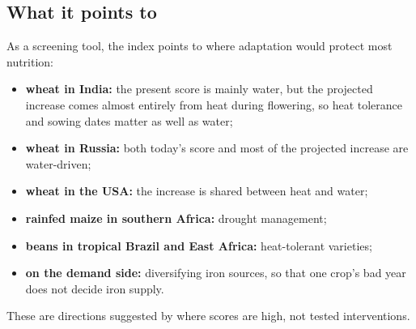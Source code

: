 \subsection{What it points to}
As a screening tool, the index points to where adaptation would protect most nutrition:
\begin{itemize}
\item \textbf{wheat in India:} the present score is mainly water, but the projected increase comes almost entirely
from heat during flowering, so heat tolerance and sowing dates matter as well as water;
\item \textbf{wheat in Russia:} both today's score and most of the projected increase are water-driven;
\item \textbf{wheat in the USA:} the increase is shared between heat and water;
\item \textbf{rainfed maize in southern Africa:} drought management;
\item \textbf{beans in tropical Brazil and East Africa:} heat-tolerant varieties;
\item \textbf{on the demand side:} diversifying iron sources, so that one crop's bad year does not decide iron
supply.
\end{itemize}
These are directions suggested by where scores are high, not tested interventions.

